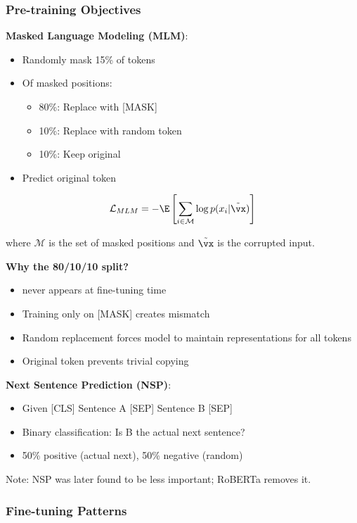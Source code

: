 \subsubsection{Pre-training Objectives}

\textbf{Masked Language Modeling (MLM)}:
\begin{itemize}
    \item Randomly mask 15\% of tokens
    \item Of masked positions:
    \begin{itemize}
        \item 80\%: Replace with [MASK]
        \item 10\%: Replace with random token
        \item 10\%: Keep original
    \end{itemize}
    \item Predict original token
\end{itemize}

\begin{equation}
\mathcal{L}_{MLM} = -\E\left[\sum_{i \in \mathcal{M}} \log p(x_i | \tilde{\vx})\right]
\end{equation}

where $\mathcal{M}$ is the set of masked positions and $\tilde{\vx}$ is the corrupted input.

\textbf{Why the 80/10/10 split?}
\begin{itemize}
    \item [MASK] never appears at fine-tuning time
    \item Training only on [MASK] creates mismatch
    \item Random replacement forces model to maintain representations for all tokens
    \item Original token prevents trivial copying
\end{itemize}

\textbf{Next Sentence Prediction (NSP)}:
\begin{itemize}
    \item Given [CLS] Sentence A [SEP] Sentence B [SEP]
    \item Binary classification: Is B the actual next sentence?
    \item 50\% positive (actual next), 50\% negative (random)
\end{itemize}

Note: NSP was later found to be less important; RoBERTa removes it.

\subsubsection{Fine-tuning Patterns}


